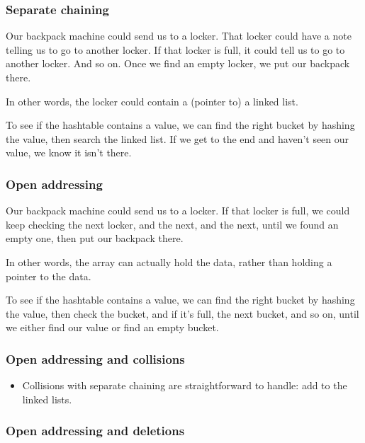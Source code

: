 \documentclass{beamer}
\begin{document}
\begin{frame}
    \frametitle{Separate chaining}

    Our backpack machine could send us to a locker. That locker could have a
    note telling us to go to another locker. If that locker is full, it could
    tell us to go to another locker. And so on. Once we find an empty locker,
    we put our backpack there.


    \vspace{1em}

    In other words, the locker could contain a (pointer to) a linked list.

    \vspace{1em}

    To see if the hashtable contains a value, we can find the right bucket by
    hashing the value, then search the linked list. If we get to the end and
    haven't seen our value, we know it isn't there.
\end{frame}

\begin{frame}
    \frametitle{Open addressing}

    Our backpack machine could send us to a locker. If that locker is full,
    we could keep checking the next locker, and the next, and the next, until
    we found an empty one, then put our backpack there.

    \vspace{1em}

    In other words, the array can actually hold the data, rather than holding
    a pointer to the data.

    \vspace{1em}

    To see if the hashtable contains a value, we can find the right bucket by
    hashing the value, then check the bucket, and if it's full, the next
    bucket, and so on, until we either find our value or find an empty
    bucket.
\end{frame}

\begin{frame}
    \frametitle{Open addressing and collisions}

    \begin{itemize}
        \item Collisions with separate chaining are straightforward to
        handle: add to the linked lists.
    \end{itemize}
\end{frame}

\begin{frame}
    \frametitle{Open addressing and deletions}

    
\end{frame}

\begin{frame}
    \frametitle{}
\end{frame}
\end{document}
